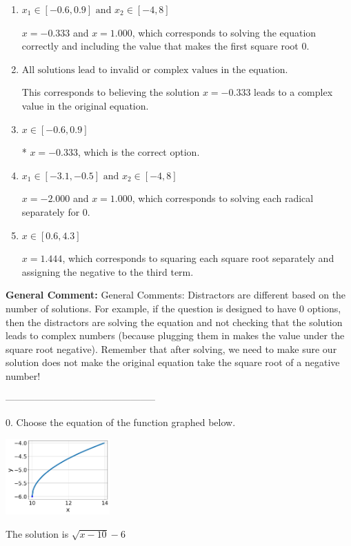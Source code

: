 \documentclass{extbook}[14pt]
\begin{document}
\begin{enumerate}[label=\Alph*.] 
\item $ x_1 \in [-0.6, 0.9] \text{ and } x_2 \in [-4,8] $ 

 $x = -0.333$ and $x = 1.000$, which corresponds to solving the equation correctly and including the value that makes the first square root 0. 
\item $ \text{All solutions lead to invalid or complex values in the equation.} $ 

 This corresponds to believing the solution $x = -0.333$ leads to a complex value in the original equation. 
\item $ x \in [-0.6,0.9] $ 

 * $x = -0.333$, which is the correct option. 
\item $ x_1 \in [-3.1, -0.5] \text{ and } x_2 \in [-4,8] $ 

 $x = -2.000$ and $x = 1.000$, which corresponds to solving each radical separately for 0. 
\item $ x \in [0.6,4.3] $ 

 $x = 1.444$, which corresponds to squaring each square root separately and assigning the negative to the third term. 
\end{enumerate} 
 
\textbf{General Comment:} General Comments: Distractors are different based on the number of solutions. For example, if the question is designed to have 0 options, then the distractors are solving the equation and not checking that the solution leads to complex numbers (because plugging them in makes the value under the square root negative). Remember that after solving, we need to make sure our solution does not make the original equation take the square root of a negative number! 

-----------------------------------------------

0. Choose the equation of the function graphed below.
\begin{center} \includegraphics[width=0.3\textwidth]{../Figures/radicalGraphToEquationC.png} \end{center} 

The solution is $ \sqrt{x - 10} - 6 $ 
\end{document}

